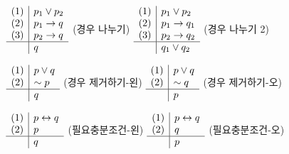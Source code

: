 \begin{center}
    \(
        \begin{array}{c|l}
            (1) & p_1 \vee p_2 \\ (2) & p_1 \rightarrow q \\ (3) & p_2 \rightarrow q \\\hline & q
        \end{array}
    \)
    (경우 나누기)
    \qquad \qquad
    \(
        \begin{array}{c|l}
            (1) & p_1 \vee p_2 \\ (2) & p_1 \rightarrow q_1 \\ (3) & p_2 \rightarrow q_2 \\\hline & q_1 \vee q_2
        \end{array}
    \)
    (경우 나누기 2)
\end{center}

\begin{center}
    \(
        \begin{array}{c|l}
            (1) & p \vee q \\ (2) & \sim p \\\hline & q
        \end{array}
    \)
    (경우 제거하기-왼)
    \qquad \qquad
    \(
        \begin{array}{c|l}
            (1) & p \vee q \\ (2) & \sim q \\\hline & p
        \end{array}
    \)
    (경우 제거하기-오)
\end{center}

\begin{center}
    \(
        \begin{array}{c|l}
            (1) & p \leftrightarrow q \\ (2) & p \\\hline & q
        \end{array}
    \)
    (필요충분조건-왼)
    \qquad \qquad
    \(
        \begin{array}{c|l}
            (1) & p \leftrightarrow q \\ (2) & q \\\hline & p
        \end{array}
    \)
    (필요충분조건-오)
\end{center}
